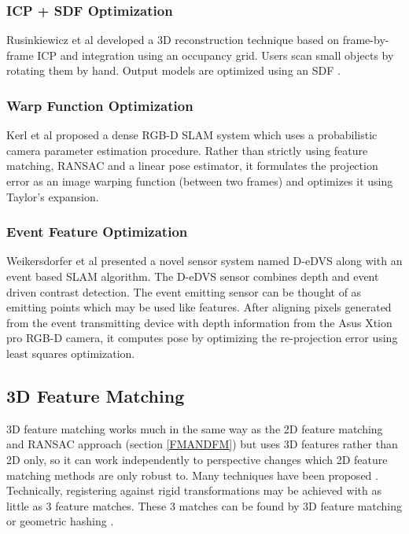 \subsubsection{ICP + SDF Optimization}

Rusinkiewicz et al \cite{Rusinkiewicz02Real} developed a 3D reconstruction technique based on frame-by-frame ICP and integration using an occupancy grid. Users scan small objects by rotating them by hand. Output models are optimized using an SDF \cite{Curless96Volumetric}.


\subsubsection{Warp Function Optimization} 

Kerl et al \cite{Kerl13Dense} proposed a dense RGB-D SLAM system which uses a probabilistic camera parameter estimation procedure. Rather than strictly using feature matching, RANSAC and a linear pose estimator, it formulates the projection error as an image warping function (between two frames) and optimizes it using Taylor's expansion.

\subsubsection{Event Feature Optimization}

Weikersdorfer et al \cite{Weikersdorfer14Event} presented a novel sensor system named D-eDVS along with an event based SLAM algorithm. The D-eDVS sensor combines depth and event driven contrast detection. The event emitting sensor can be thought of as emitting points which may be used like features. After aligning pixels generated from the event transmitting device with depth information from the Asus Xtion pro RGB-D camera, it computes pose by optimizing the re-projection error using least squares optimization.


\subsection{3D Feature Matching}

3D feature matching works much in the same way as the 2D feature matching and RANSAC approach (section \ref{FMANDFM}) but uses 3D features rather than 2D only, so it can work independently to perspective changes which 2D feature matching methods are only robust to. Many techniques have been proposed \cite{Scovanner073Dimensional,Flitton10Object,Li05Multiscale}. Technically, registering against rigid transformations may be achieved with as little as 3 feature matches. These 3 matches can be found by 3D feature matching or geometric hashing \cite{Wolfson97Geometric}.



